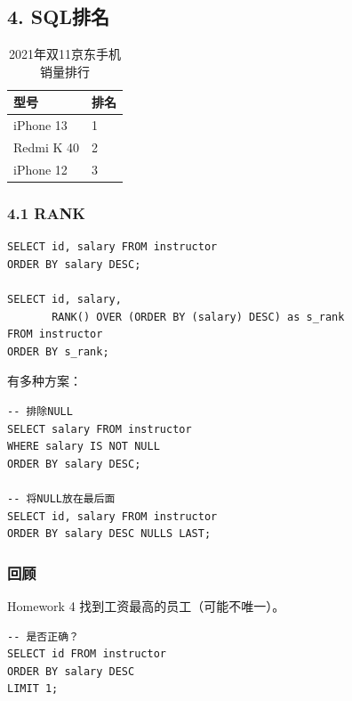 \documentclass[aspectratio=169, 14pt]{beamer}
\begin{document}
\begin{frame}
    \section{\textcolor{darkmidnightblue}{4. SQL排名}} 

    \begin{table}
        \caption*{2021年双11京东手机销量排行}
        \begin{tabular}{ll}
          \toprule
          型号 & 排名 \\
          \midrule
          iPhone 13 & 1 \\
          Redmi K 40 & 2 \\
          iPhone 12 & 3 \\
          \bottomrule
        \end{tabular}
    \end{table}
\end{frame}

\begin{frame}[fragile]
    \frametitle{4.1 RANK}

    \begin{verbatim}
SELECT id, salary FROM instructor
ORDER BY salary DESC;

SELECT id, salary, 
       RANK() OVER (ORDER BY (salary) DESC) as s_rank
FROM instructor
ORDER BY s_rank;
    \end{verbatim}    

    \pause

\end{frame}

\begin{frame}[fragile]

有多种方案：
\begin{verbatim}
-- 排除NULL
SELECT salary FROM instructor
WHERE salary IS NOT NULL
ORDER BY salary DESC;

-- 将NULL放在最后面
SELECT id, salary FROM instructor
ORDER BY salary DESC NULLS LAST;
\end{verbatim}       

\end{frame}

\begin{frame}[fragile]
    \frametitle{回顾}
\begin{exampleblock}{Homework 4}
找到工资最高的员工（可能不唯一）。    
\end{exampleblock}
    
\begin{verbatim}
-- 是否正确？
SELECT id FROM instructor
ORDER BY salary DESC
LIMIT 1;
\end{verbatim}

\end{frame}
\end{document}
